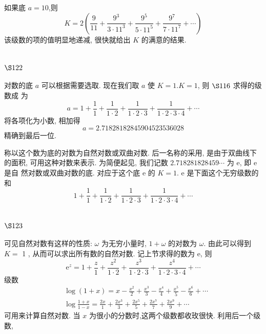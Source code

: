 如果底 $a=10$,则
\[
K=2\left(\frac{9}{11}+\frac{9^{3}}{3 \cdot 11^{3}}+\frac{9^{5}}{5 \cdot 11^{5}}+\frac{9^{7}}{7 \cdot 11^{7}}+\cdots\right)
\]
该级数的项的值明显地递减, 很快就给出 $K$ 的满意的结果.

\section{$\S 122$}

对数的底 $a$ 可以根据需要选取. 现在我们取 $a$ 使 $K=1 . K=1$, 则 $\S 116$ 求得的级数成 为
\[
a=1+\frac{1}{1}+\frac{1}{1 \cdot 2}+\frac{1}{1 \cdot 2 \cdot 3}+\frac{1}{1 \cdot 2 \cdot 3 \cdot 4}+\cdots
\]
将各项化为小数, 相加得
\[
a=2.71828182845904523536028
\]
精确到最后一位.

称以这个数为底的对数为自然对数或双曲对数. 后一名称的采用, 是由于双曲线下 的面积, 可用这种对数来表示. 为简便起见, 我们记数 $2.718281828459 \cdots$ 为 e, 即 $\mathrm{e}$ 是自 然对数或双曲对数的底. 对应于这个底 $\mathrm{e}$ 的 $K=1$. e 是下面这个无穷级数的和
\[
1+\frac{1}{1}+\frac{1}{1 \cdot 2}+\frac{1}{1 \cdot 2 \cdot 3}+\frac{1}{1 \cdot 2 \cdot 3 \cdot 4}+\cdots
\]
\section{$\S 123$}

可见自然对数有这样的性质: $\omega$ 为无穷小量时, $1+\omega$ 的对数为 $\omega$. 由此可以得到 $K=$ 1 , 从而可以求出所有数的自然对数. 记上节求得的数为 $\mathrm{e}$, 则
\[
\mathrm{e}^{z}=1+\frac{z}{1}+\frac{z^{2}}{1 \cdot 2}+\frac{z^{3}}{1 \cdot 2 \cdot 3}+\frac{z^{4}}{1 \cdot 2 \cdot 3 \cdot 4}+\cdots
\]
级数
\[
\begin{aligned}
& \log (1+x)=x-\frac{x^{2}}{2}+\frac{x^{3}}{3}-\frac{x^{4}}{4}+\frac{x^{5}}{5}-\frac{x^{6}}{6}+\cdots \\
& \log \frac{1+x}{1-x}=\frac{2 x}{1}+\frac{2 x^{3}}{3}+\frac{2 x^{5}}{5}+\frac{2 x^{7}}{7}+\frac{2 x^{9}}{9}+\cdots
\end{aligned}
\]
可用来计算自然对数. 当 $x$ 为很小的分数时,这两个级数都收玫很快. 利用后一个级数, 

